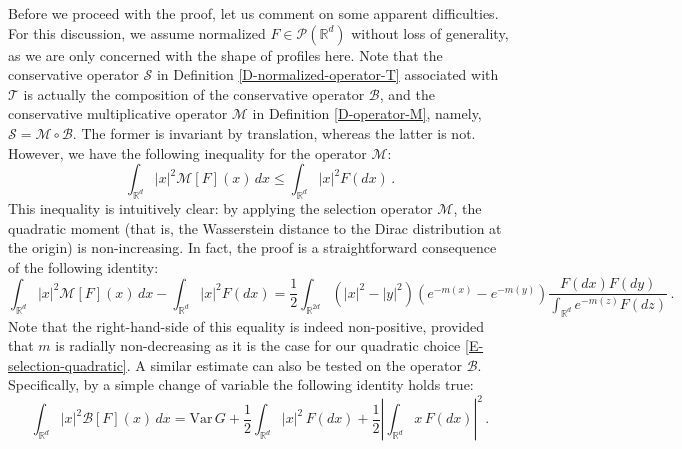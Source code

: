 \documentclass[reqno]{amsart}
\numberwithin{equation}{section}
\begin{document}
{Before we proceed with the proof, let us comment on some apparent difficulties. For this discussion, we assume normalized $F\in \mathcal{P}(\mathbb{R}^d)$ without loss of generality, as we are only concerned with the shape of profiles here. Note that the conservative operator $\mathcal S$ in Definition \ref{D-normalized-operator-T} associated with $\mathcal{T}$ is actually the composition of the conservative operator $\mathcal B$, and the conservative multiplicative operator $\mathcal M$ in Definition \ref{D-operator-M}, namely, $\mathcal S = \mathcal M\circ \mathcal B$. The former is invariant by translation, whereas the latter is not. However, we have the following inequality for the operator $\mathcal{M}$:
\begin{equation}\label{eq:variance M}
\int_{\mathbb{R}^d} |x|^2 \mathcal M[F](x)\,dx \leq \int_{\mathbb{R}^d}  |x|^2 F(dx)\,. 
\end{equation}
This inequality is intuitively clear: by applying the selection operator $\mathcal{M}$, the quadratic moment (that is, the Wasserstein distance to the Dirac distribution at the origin) is non-increasing. In fact, the proof is a straightforward consequence of the following identity:
$$
\int_{\mathbb{R}^d} |x|^2 \mathcal M[F](x)\,dx - \int_{\mathbb{R}^d} \vert x\vert^2 F(dx)  = \frac12  \int_{\mathbb{R}^{2d}} \left( |x|^2 - |y|^2 \right) \left(e^{-m(x)} - e^{-m(y)}\right) \dfrac{F(dx) F(dy)}{\int_{\mathbb{R}^d} e^{-m(z)}F(dz)}\,. 
$$
Note that the right-hand-side of this equality is indeed non-positive, provided that $m$ is radially non-decreasing as it is the case for our quadratic choice \eqref{E-selection-quadratic}. A similar estimate can also be tested on the operator $\mathcal B$. Specifically, by a simple change of variable the following identity holds true:
\begin{equation}\label{eq:variance B}
\int_{\mathbb{R}^d} |x|^2 \mathcal B[F](x)\,dx  = \mbox{Var}\,G +  \frac12 \int_{\mathbb{R}^d}  |x|^2\,F(dx) +\dfrac12 \left\vert\int_{\mathbb{R}^d} x\,F(dx)\right\vert^2\,. 
\end{equation}
}
\end{document}

